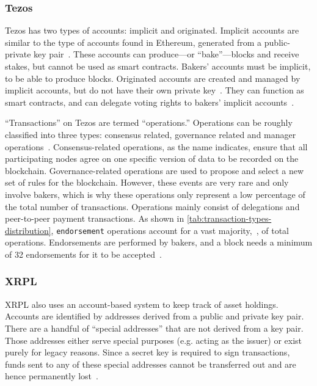 
\subsubsection{Tezos}
Tezos has two types of accounts: implicit and originated.
Implicit accounts are similar to the type of accounts found in Ethereum, generated from a public-private key pair~\cite{Wood2014}.
These accounts can produce---or ``bake''---blocks and receive stakes, but cannot be used as smart contracts.
Bakers' accounts must be implicit, to be able to produce blocks.
Originated accounts are created and managed by implicit accounts, but do not have their own private key~\cite{NomadicLabs2018a}. 
They can function as smart contracts, and can delegate voting rights to bakers' implicit accounts~\cite{Labs2018}.

``Transactions'' on Tezos are termed  ``operations.''
Operations can be roughly classified into three types: consensus related, governance related and manager operations~\cite{AmitPanghal2019}.
Consensus-related operations, as the name indicates, ensure that all participating nodes agree on one specific version of data to be recorded on the blockchain. 
Governance-related operations are used to propose and select a new set of rules for the blockchain. 
However, these events are very rare and only involve bakers, which is why these operations only represent a low percentage of the total number of transactions. 
Operations mainly consist of delegations and peer-to-peer payment transactions. 
As shown in \autoref{tab:transaction-types-distribution}, \texttt{endorsement} operations account for a vast majority,~, of total operations.
Endorsements are performed by bakers, and a block needs a minimum of 32 endorsements for it to be accepted~\cite{NomadicLabs2018b}.



\subsubsection{XRPL}
XRPL also uses an account-based system to keep track of asset holdings. 
Accounts are identified by addresses derived from a public and private key pair. 
There are a handful of ``special addresses'' that are not derived from a key pair. 
Those addresses either serve special purposes (e.g. acting as the  issuer) or exist purely for legacy reasons. 
Since a secret key is required to sign transactions, funds sent to any of these special addresses cannot be transferred out and are hence permanently lost~\cite{XRPLedger2019}.

